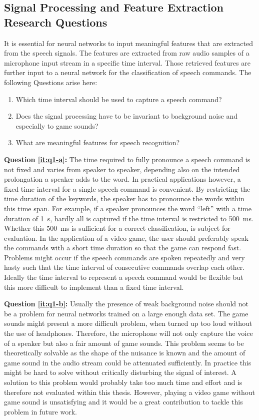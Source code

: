 \subsection{Signal Processing and Feature Extraction Research Questions}\label{sec:intro_rq_signal}
It is essential for neural networks to input meaningful features that are extracted from the speech signals. 
The features are extracted from raw audio samples of a microphone input stream in a specific time interval.
Those retrieved features are further input to a neural network for the classification of speech commands.
The following Questions arise here:
\begin{enumerate}[label={Q.1.\alph*)}, leftmargin=1.75cm]
  \item Which time interval should be used to capture a speech command?\label{it:q1-a}
  \item Does the signal processing have to be invariant to background noise and especially to game sounds?\label{it:q1-b}
  \item What are meaningful features for speech recognition?\label{it:q1-c}
\end{enumerate}
\noindent
\textbf{Question \ref{it:q1-a}:} 
The time required to fully pronounce a speech command is not fixed and varies from speaker to speaker, depending also on the intended prolongation a speaker adds to the word.
In practical applications however, a fixed time interval for a single speech command is convenient.
By restricting the time duration of the keywords, the speaker has to pronounce the words within this time span.
For example, if a speaker pronounces the word \enquote{left} with a time duration of \SI{1}{\second}, hardly all is captured if the time interval is restricted to \SI{500}{\milli\second}.
Whether this \SI{500}{\milli\second} is sufficient for a correct classification, is subject for evaluation.
In the application of a video game, the user should preferably speak the commands with a short time duration so that the game can respond fast.
Problems might occur if the speech commands are spoken repeatedly and very hasty such that the time interval of consecutive commands overlap each other.
Ideally the time interval to represent a speech command would be flexible but this more difficult to implement than a fixed time interval.

\textbf{Question \ref{it:q1-b}:}
Usually the presence of weak background noise should not be a problem for neural networks trained on a large enough data set. 
The game sounds might present a more difficult problem, when turned up too loud without the use of headphones. 
Therefore, the microphone will not only capture the voice of a speaker but also a fair amount of game sounds. 
This problem seems to be theoretically solvable as the shape of the nuisance is known and the amount of game sound in the audio stream could be attenuated sufficiently.
In practice this might be hard to solve without critically disturbing the signal of interest.
A solution to this problem would probably take too much time and effort and is therefore not evaluated within this thesis. 
However, playing a video game without game sound is unsatisfying and it would be a great contribution to tackle this problem in future work.

